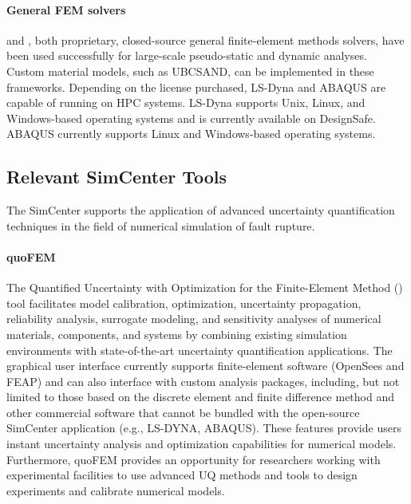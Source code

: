 \paragraph{General FEM solvers}
 and , both proprietary, closed-source general finite-element methods solvers, have been used successfully for large-scale pseudo-static and dynamic analyses. Custom material models, such as UBCSAND, can be implemented in these frameworks. Depending on the license purchased, LS-Dyna and ABAQUS are capable of running on HPC systems. LS-Dyna supports Unix, Linux, and Windows-based operating systems and is currently available on DesignSafe. ABAQUS currently supports Linux and Windows-based operating systems.

\subsection{Relevant SimCenter Tools}

The SimCenter supports the application of advanced uncertainty quantification techniques in the field of numerical simulation of fault rupture.

\paragraph{quoFEM} The Quantified Uncertainty with Optimization for the Finite-Element Method () tool facilitates model calibration, optimization, uncertainty propagation, reliability analysis, surrogate modeling, and sensitivity analyses of numerical materials, components, and systems by combining existing simulation environments with state-of-the-art uncertainty quantification applications. The graphical user interface currently supports finite-element software (OpenSees and FEAP) and can also interface with custom analysis packages, including, but not limited to those based on the discrete element and finite difference method and other commercial software that cannot be bundled with the open-source SimCenter application (e.g., LS-DYNA, ABAQUS). These features provide users instant uncertainty analysis and optimization capabilities for numerical models. Furthermore, quoFEM provides an opportunity for researchers working with experimental facilities to use advanced UQ methods and tools to design experiments and calibrate numerical models.



